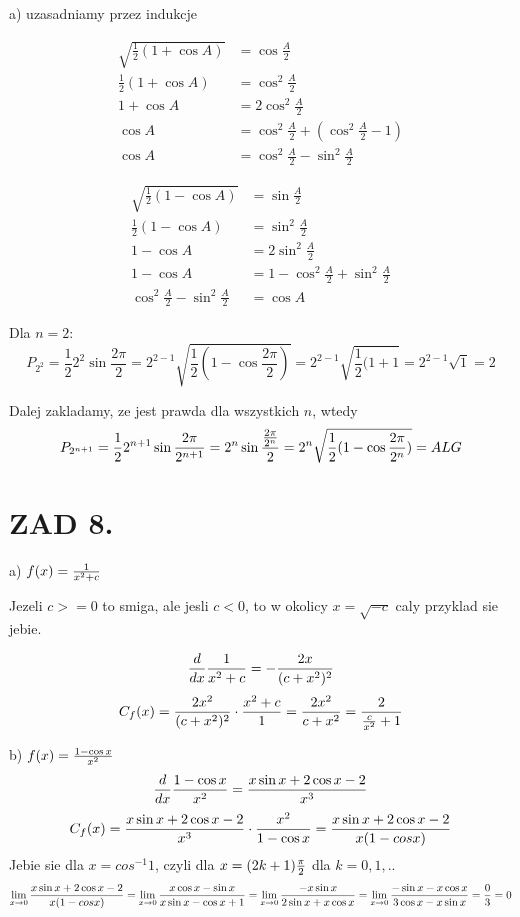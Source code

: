 \documentclass{article}[13pt]
\begin{document}
    a) uzasadniamy przez indukcje
    \medskip

    \begin{align*}
        \sqrt{\frac12(1+\cos A)}&=\cos\frac A2\\
        \frac12(1+\cos A)&=\cos^2\frac A2\\
        1+\cos A&=2\cos^2\frac A2\\
        \cos A&=\cos^2\frac A2+(\cos^2\frac A2-1)\\
        \cos A&=\cos^2\frac A2-\sin^2\frac A2
    \end{align*}

    \begin{align*}
        \sqrt{\frac12(1-\cos A)}&=\sin \frac A2\\
        \frac12(1-\cos A)&=\sin^2\frac A2\\
        1-\cos A&=2\sin^2\frac A2\\
        1-\cos A&=1-\cos^2\frac A2+\sin^2\frac A2\\
        \cos^2\frac A2-\sin^2\frac A2&=\cos A
    \end{align*}

    Dla $n=2$:
    $$P_{2^2}=\frac12 2^2\sin\frac{2\pi}2=2^{2-1}\sqrt{\frac12(1-\cos\frac{2\pi}2)}=2^{2-1}\sqrt{\frac12(1+1}=2^{2-1}\sqrt{1}=2$$

    Dalej zakladamy, ze jest prawda dla wszystkich $n$, wtedy
    \begin{align*}
        P_{2^{n+1}}=\frac122^{n+1}\sin\frac{2\pi}{2^{n+1}}=2^n\sin{\frac{2\pi}{2^n}\over 2}=2^n\sqrt{\frac12(1-\cos\frac{2\pi}{2^n})}=ALG
    \end{align*}

    \section*{ZAD 8.}
    a) $f(x)={1\over x^2+c}$

    Jezeli $c>=0$ to smiga, ale jesli $c<0$, to w okolicy $x=\sqrt{-c}$ caly przyklad sie jebie.

    $${d\over dx}{1\over x^2+c}=-{2x\over (c+x^2)^2}$$
    $$C_f(x)={2x^2\over (c+x^2)^2}\cdot{x^2+c\over 1}={2x^2\over c+x^2}={2\over \frac{c}{x^2}+1}$$
    \medskip

    b) $f(x)={1-\cos x\over x^2}$
    $${d\over dx}{1-\cos x\over x^2}={x\sin x+2\cos x-2\over x^3}$$
    $$C_f(x)={x\sin x+2\cos x-2\over x^3}\cdot {x^2\over 1-\cos x}={x\sin x+2\cos x-2\over x(1-cos x)}$$
    Jebie sie dla $x = cos^{-1}1$, czyli dla $x=(2k+1){\pi\over 2}$ dla $k=0,1, ..$
    $$\lim\limits_{x\to 0}{x\sin x+2\cos x-2\over x(1-cos x)}=\lim\limits_{x\to 0}{x\cos x-\sin x\over x\sin x-\cos x+1}=\lim\limits_{x\to 0}{-x\sin x\over 2\sin x+x\cos x}=\lim\limits_{x\to 0}{-\sin x-x\cos x \over 3\cos x-x\sin x}=\frac03=0$$
\end{document}
